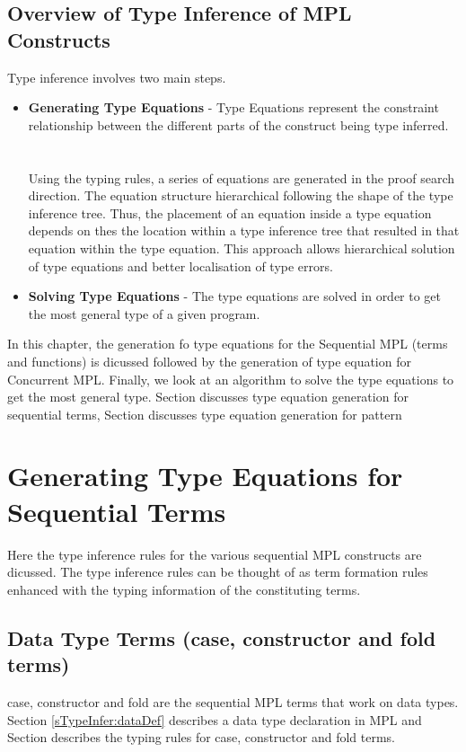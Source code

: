 \documentclass[11pt]{article}
\begin{document}
\subsection {Overview of Type Inference of MPL Constructs}
Type inference involves two main steps. 
\begin {itemize}
\item {\bf Generating Type Equations} - Type Equations represent the constraint relationship between the different parts of the construct being type inferred. 
~~\\~~\\
Using the typing rules, a series of equations are generated in the proof search direction. The equation structure hierarchical following the shape of the type inference tree. Thus, the placement of an equation inside a type equation depends on thes the location within a type inference tree that resulted in that equation within the type equation. This approach allows hierarchical solution of type equations and better localisation of type errors.     
\item {\bf Solving Type Equations} - The type equations are solved in order to get the most general type of a given program.
\end{itemize}
In this chapter, the generation fo type equations for the Sequential MPL (terms and functions) is dicussed followed by the generation of type equation for Concurrent MPL. Finally, we look at an algorithm to solve the type equations to get the most general type. Section discusses type equation generation for sequential terms, Section discusses type equation generation for pattern

\section {Generating Type Equations for Sequential Terms }
Here the type inference rules for the various sequential MPL constructs are dicussed. The type inference rules can be thought of as term formation rules enhanced with the typing information of the constituting terms.

\subsection {Data Type Terms (case, constructor and fold terms)}\label{STInfer:DataTypeTerms}
{\sf case, constructor} and {\sf fold} are the sequential MPL terms that work on data types. Section \ref {sTypeInfer:dataDef} describes a data type declaration in MPL and Section describes the typing rules for {\sf case, constructor} and {\sf fold} terms.
\end{document}
